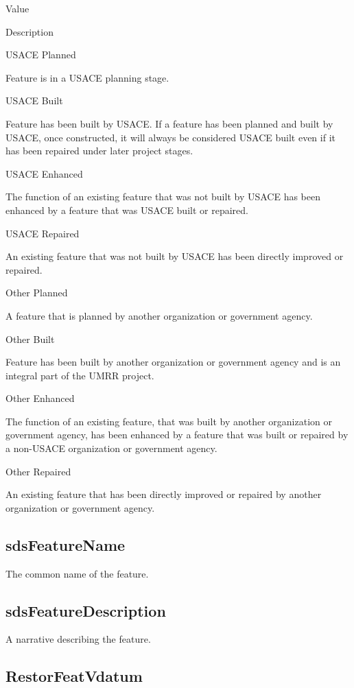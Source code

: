 \documentclass[
  letterpaper,
  DIV=11,
  numbers=noendperiod]{scrreprt}
\begin{document}
Value

Description

USACE Planned

Feature is in a USACE planning stage.

USACE Built

Feature has been built by USACE. If a feature has been planned and built
by USACE, once constructed, it will always be considered USACE built
even if it has been repaired under later project stages.

USACE Enhanced

The function of an existing feature that was not built by USACE has been
enhanced by a feature that was USACE built or repaired.

USACE Repaired

An existing feature that was not built by USACE has been directly
improved or repaired.

Other Planned

A feature that is planned by another organization or government agency.

Other Built

Feature has been built by another organization or government agency and
is an integral part of the UMRR project.

Other Enhanced

The function of an existing feature, that was built by another
organization or government agency, has been enhanced by a feature that
was built or repaired by a non-USACE organization or government agency.

Other Repaired

An existing feature that has been directly improved or repaired by
another organization or government agency.

\subsection{sdsFeatureName}\label{sdsfeaturename-23}

The common name of the feature.

\subsection{sdsFeatureDescription}\label{sdsfeaturedescription-23}

A narrative describing the feature.

\subsection{RestorFeatVdatum}\label{restorfeatvdatum-23}
\end{document}
